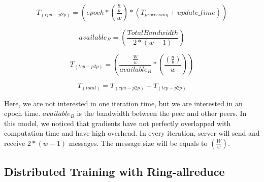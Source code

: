 \documentclass[conference]{IEEEtran}
\begin{document}
\begin{equation}
T_{(cpu-p2p)} = (epoch* (\frac{\frac{n}{b}}{w}) * (T_{processing}+ update\_time))
\end{equation}

\begin{equation} \label{eq:B}
available_{B} =(\frac{Total Bandwidth}{2*(w-1)})
\end{equation}

\begin{equation}
T_{(tcp-p2p)}  =  (\frac{\frac{W}{w}}{available_{B}} * (\frac{(\frac{n}{b})}{w}))
\end{equation}

\begin{equation}
T_{(total)} = T_{(cpu-p2p)} + T_{(tcp-p2p)}
\end{equation}

Here, we are not interested in one iteration time, but we are interested in an epoch time. $available_{B}$ is the bandwidth between the peer and other peers. In this model, we noticed that gradients have not perfectly overlapped with computation time and have high overhead. In every iteration, server will send and receive $2*(w-1)$ messages. The message size will be equals to $(\frac{W}{w})$.


\subsection{Distributed Training with Ring-allreduce}
\label{sec:permodelr}
\end{document}
